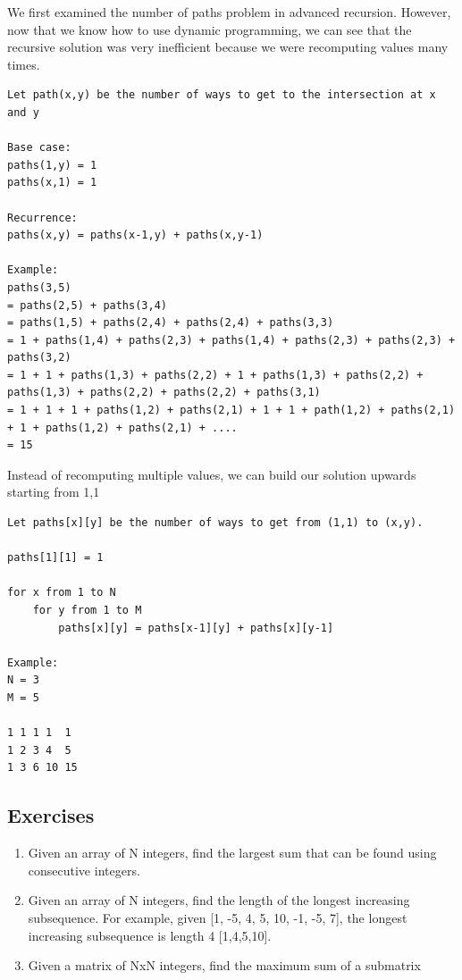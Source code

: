 \documentclass[11pt,oneside]{book}
\begin{document}
We first examined the number of paths problem in advanced recursion. However, now that we know how to use dynamic programming, we can see that the recursive solution was very inefficient because we were recomputing values many times.

\begin{lstlisting}
Let path(x,y) be the number of ways to get to the intersection at x and y

Base case:
paths(1,y) = 1
paths(x,1) = 1

Recurrence:
paths(x,y) = paths(x-1,y) + paths(x,y-1)

Example:
paths(3,5)
= paths(2,5) + paths(3,4)
= paths(1,5) + paths(2,4) + paths(2,4) + paths(3,3)
= 1 + paths(1,4) + paths(2,3) + paths(1,4) + paths(2,3) + paths(2,3) + paths(3,2)
= 1 + 1 + paths(1,3) + paths(2,2) + 1 + paths(1,3) + paths(2,2) + paths(1,3) + paths(2,2) + paths(2,2) + paths(3,1)
= 1 + 1 + 1 + paths(1,2) + paths(2,1) + 1 + 1 + path(1,2) + paths(2,1) + 1 + paths(1,2) + paths(2,1) + ....
= 15
\end{lstlisting}

Instead of recomputing multiple values, we can build our solution upwards starting from 1,1

\begin{lstlisting}
Let paths[x][y] be the number of ways to get from (1,1) to (x,y). 

paths[1][1] = 1

for x from 1 to N
    for y from 1 to M
        paths[x][y] = paths[x-1][y] + paths[x][y-1]

Example:
N = 3
M = 5

1 1 1 1  1
1 2 3 4  5
1 3 6 10 15
\end{lstlisting}

\subsection{Exercises}

\begin{enumerate}
\item Given an array of N integers, find the largest sum that can be found using consecutive integers.
\item Given an array of N integers, find the length of the longest increasing subsequence. For example, given [1, -5, 4, 5, 10, -1, -5, 7], the longest increasing subsequence is length 4 [1,4,5,10].
\item Given a matrix of NxN integers, find the maximum sum of a submatrix
\end{enumerate}
\end{document}
